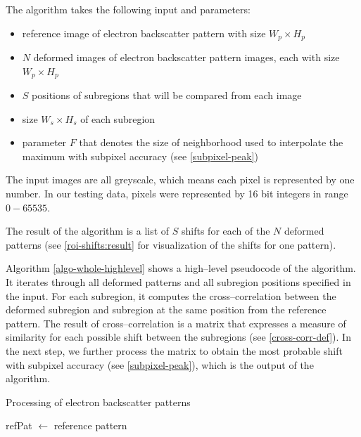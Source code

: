 The algorithm takes the following input and parameters:
\begin{itemize}
	\item reference image of electron backscatter pattern with size $W_p \times H_p$
	\item $N$ deformed images of electron backscatter pattern images, each with size $W_p \times H_p$
	\item $S$ positions of subregions that will be compared from each image
	\item size $W_s \times H_s$ of each subregion
	\item parameter $F$ that denotes the size of neighborhood used to interpolate the maximum with subpixel accuracy (see \cref{subpixel-peak})
\end{itemize}
The input images are all greyscale, which means each pixel is represented by one number. In our testing data, pixels were represented by 16 bit integers in range~$0 - 65535$.

The result of the algorithm is a list of $S$ shifts for each of the $N$ deformed patterns (see \cref{roi-shifts:result} for visualization of the shifts for one pattern).

Algorithm \ref{algo-whole-highlevel} shows a high--level pseudocode of the algorithm. It iterates through all deformed patterns and all subregion positions specified in the input. For each subregion, it computes the cross--correlation between the deformed subregion and subregion at the same position from the reference pattern. The result of cross--correlation is a matrix that expresses a measure of similarity for each possible shift between the subregions (see \cref{cross-corr-def}). In the next step, we further process the matrix to obtain the most probable shift with subpixel accuracy (see \cref{subpixel-peak}), which is the output of the algorithm.

\begin{algorithm}
	\caption{Processing of electron backscatter patterns}
	\label{algo-whole-highlevel}
	\vspace{5px}
	
	refPat  $\leftarrow$ reference pattern\;
\end{algorithm}

